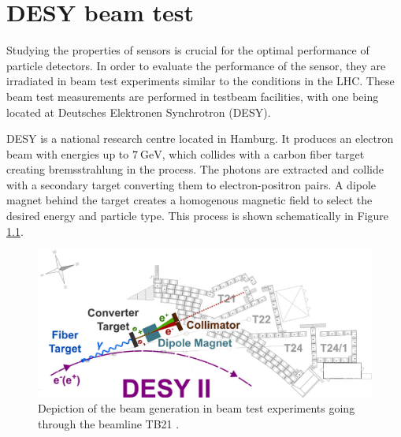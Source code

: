 \chapter{DESY beam test}
Studying the properties of sensors is crucial for the optimal performance of particle detectors.
In order to evaluate the performance of the sensor, they are irradiated in beam test experiments similar to the conditions in the LHC.
These beam test measurements are performed in testbeam facilities, with one being located at Deutsches Elektronen Synchrotron (DESY).

DESY is a national research centre located in Hamburg.
It produces an electron beam with energies up to
$\SI{7}{\GeV}$, which collides with a carbon fiber target creating bremsstrahlung in the process. The photons are extracted and collide with a secondary target
converting them to electron-positron pairs. A dipole magnet behind the target creates a homogenous magnetic field to select the desired energy and particle type. This process
is shown schematically in Figure \ref{fig:testbeam}.

\begin{figure}
  \centering
  \includegraphics[height=0.4\textwidth]{images/desy_modified.jpg}
  \caption{Depiction of the beam generation in beam test experiments going through the beamline TB21 \cite{testbeam}.}
  \label{fig:testbeam}
\end{figure}

